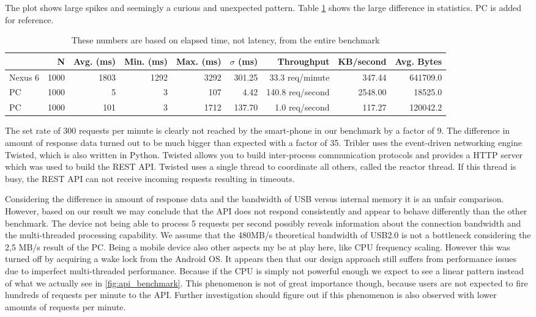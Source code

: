The plot shows large spikes and seemingly a curious and unexpected pattern.
Table \ref{table:api_benchmark} shows the large difference in statistics.
PC is added for reference.
\begin{table}
  \begin{tabular}{l | *{8}{r}} \hline
  	 & N & Avg. (ms) & Min. (ms) & Max. (ms) & $\sigma$ (ms) & Throughput & KB/second & Avg. Bytes \\ \hline \hline
	Nexus 6 & 1000 & 1803 & 1292 & 3292 & 301.25 & 33.3 req/minute & 347.44 & 641709.0 \\ \hline
	PC         & 1000 & 5        & 3      & 107   & 4.42     & 140.8 req/second & 2548.00 & 18525.0 \\ \hline
	PC         & 1000 & 101    & 3      & 1712 & 137.70 & 1.0 req/second     & 117.27   & 120042.2 \\ \hline
	
  \end{tabular}
  \caption{These numbers are based on elapsed time, not latency, from the entire benchmark}
  \label{table:api_benchmark}
\end{table}
The set rate of 300 requests per minute is clearly not reached by the smart-phone in our benchmark by a factor of 9.
The difference in amount of response data turned out to be much bigger than expected with a factor of 35.
Tribler uses the event-driven networking engine Twisted, which is also written in Python.
Twisted allows you to build inter-process communication protocols and provides a HTTP server which was used to build the REST API.
Twisted uses a single thread to coordinate all others, called the reactor thread.
If this thread is busy, the REST API can not receive incoming requests resulting in timeouts.

Considering the difference in amount of response data and the bandwidth of USB versus internal memory it is an unfair comparison.
However, based on our result we may conclude that the API does not respond consistently and appear to behave differently than the other benchmark.
The device not being able to process 5 requests per second possibly reveals information about the connection bandwidth and the multi-threaded processing capability.
We assume that the 480MB/s theoretical bandwidth of USB2.0 is not a bottleneck considering the 2,5 MB/s result of the PC.
Being a mobile device also other aspects my be at play here, like CPU frequency scaling.
However this was turned off by acquiring a wake lock from the Android OS.
It appears then that our design approach still suffers from performance issues due to imperfect multi-threaded performance.
Because if the CPU is simply not powerful enough we expect to see a linear pattern instead of what we actually see in \ref{fig:api_benchmark}.
This phenomenon is not of great importance though, because users are not expected to fire hundreds of requests per minute to the API.
Further investigation should figure out if this phenomenon is also observed with lower amounts of requests per minute.



